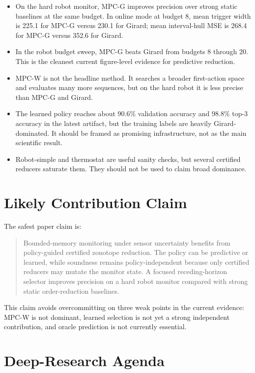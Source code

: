 \documentclass[11pt]{article}
\newcommand{\mpcg}{\textsc{MPC-G}}
\newcommand{\mpcw}{\textsc{MPC-W}}
\begin{document}
\begin{itemize}
\item On the hard robot monitor, \mpcg{} improves precision over strong static
baselines at the same budget. In online mode at budget 8, mean trigger width is
225.1 for \mpcg{} versus 230.1 for Girard; mean interval-hull MSE is 268.4 for
\mpcg{} versus 352.6 for Girard.
\item In the robot budget sweep, \mpcg{} beats Girard from budgets 8 through
20. This is the cleanest current figure-level evidence for predictive
reduction.
\item \mpcw{} is not the headline method. It searches a broader first-action
space and evaluates many more sequences, but on the hard robot it is less
precise than \mpcg{} and Girard.
\item The learned policy reaches about 90.6\% validation accuracy and 98.8\%
top-3 accuracy in the latest artifact, but the training labels are heavily
Girard-dominated. It should be framed as promising infrastructure, not as the
main scientific result.
\item Robot-simple and thermostat are useful sanity checks, but several
certified reducers saturate them. They should not be used to claim broad
dominance.
\end{itemize}

\section{Likely Contribution Claim}

The safest paper claim is:

\begin{quote}
Bounded-memory monitoring under sensor uncertainty benefits from policy-guided
certified zonotope reduction. The policy can be predictive or learned, while
soundness remains policy-independent because only certified reducers may mutate
the monitor state. A focused receding-horizon selector improves precision on a
hard robot monitor compared with strong static order-reduction baselines.
\end{quote}

This claim avoids overcommitting on three weak points in the current evidence:
\mpcw{} is not dominant, learned selection is not yet a strong independent
contribution, and oracle prediction is not currently essential.

\section{Deep-Research Agenda}
\end{document}
